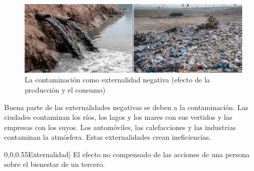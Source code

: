 \begin{figure}[h]
	\centering
	\includegraphics[width=0.7\linewidth]{images/contamina}
	\caption[Externalidades Negativas]{La contaminación como externalidad negativa (efecto de la producción y el consumo)}
	\label{fig:contamina}
\end{figure}

Buena parte de las externalidades negativas se deben a la contaminación. Las ciudades contaminan los ríos, los lagos y los mares con sus vertidos y las empresas con los suyos. Los automóviles, las calefacciones y las industrias contaminan la atmósfera. Estas externalidades crean ineficiencias.

\begin{definicion}[\textcolor[rgb]{0,0,0.55}{Externalidad}]
	El efecto no compensado de las acciones de una persona sobre el bienestar de un tercero.
\end{definicion}

